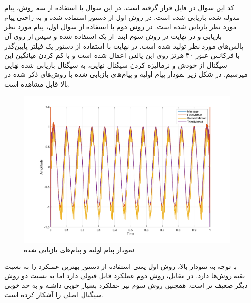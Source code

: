 \documentclass[10pt]{article}
\begin{document}
\section{}
کد این سوال در فایل 
قرار گرفته است. در این سوال با استفاده از سه روش، پیام مدوله شده بازیابی شده است. در روش اول از دستور 
استفاده شده و به راحتی پیام مورد نظر بازیابی شده است. در روش دوم با استفاده از 
سوال اول، پیام مورد نظر بازیابی و در نهایت در روش سوم ابتدا از یک 
استفاده شده و سپس از روی آن پالس‌های مورد نظر تولید شده است. در نهایت با استفاده از دستور 
یک فیلتر پایین‌گذر با فرکانس عبور ۳۰ هرتز روی این پالس اعمال شده است و با کم کردن میانگین این سیگنال از خودش و نرمالیزه کردن سیگنال نهایی، به سیگنال بازیابی شده نهایی میرسیم. در شکل زیر نمودار پیام اولیه و پیام‌های بازیابی شده با روش‌های ذکر شده در بالا قابل مشاهده است.
\begin{figure}[h]
	\centering
	\includegraphics[width=0.9\linewidth]{../pics/q3-1}
	\caption{نمودار پیام اولیه و پیام‌های بازیابی شده}
	\label{fig:q3-1}
\end{figure}

\noindent
با توجه به نمودار بالا، روش اول یعنی استفاده از دستور 
بهترین عملکرد را به نسبت بقیه روش‌ها دارد. در مقابل، روش دوم عملکرد قابل قبولی دارد اما به نسبت دو روش دیگر ضعیف تر است. همچنین روش سوم نیز عملکرد بسیار خوبی داشته و به حد خوبی سیگنال اصلی را آشکار کرده است.
\end{document}
